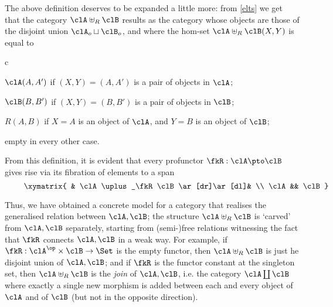 \begin{remark}\label{collage_explaned}
	The above definition deserves to be expanded a little more: from \autoref{elts} we get that the category $\clA\uplus_R\clB$ results as the category whose objects are those of the disjoint union $\clA_o\sqcup\clB_o$, and where the hom-set $\clA\uplus_R\clB(X,Y)$ is equal to
	\begin{enumtag}{c}
		\item $\clA(A,A')$ if $(X,Y)=(A,A')$ is a pair of objects in $\clA$;
		\item $\clB(B,B')$ if $(X,Y)=(B,B')$ is a pair of objects in $\clB$;
		\item $R(A,B)$ if $X=A$ is an object of $\clA$, and $Y=B$ is an object of $\clB$;
		\item empty in every other case.
	\end{enumtag}
	From this definition, it is evident that every profunctor $\fkR : \clA \pto \clB$ gives rise via its fibration of elements to a span 
	\[ \vcenter{\xymatrix{
	& \clA\uplus_\fkR \clB \ar[dr]\ar[dl]& \\ 
	\clA  && \clB
}} \]
\end{remark}
Thus, we have obtained a concrete model for a category that realises the generalised relation between $\clA,\clB$; the structure $\clA\uplus_R\clB$ is `carved' from $\clA,\clB$ separately, starting from (semi-)free relations witnessing the fact that $\fkR$ connects $\clA,\clB$ in a weak way. For example, if $\fkR : \clA^\op\times \clB \to \Set$ is the empty functor, then $\clA\uplus_R\clB$ is just he disjoint union of $\clA,\clB$; and if $\fkR$ is the functor constant at the singleton set, then $\clA\uplus_R\clB$ is the \emph{join} of $\clA,\clB$, i.e. the category $\clA\coprod\clB$ where exactly a single new morphism is added between each and every object of $\clA$ and of $\clB$ (but not in the opposite direction).